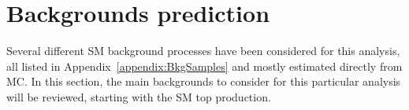 \documentclass[a4paper, 10pt, openright]{report}
\begin{document}
\chapter{Backgrounds prediction} \label{section:CR}

Several different \ac{SM} background processes have been considered for this analysis, all listed in Appendix~\ref{appendix:BkgSamples} and mostly estimated directly from \ac{MC}. In this section, the main backgrounds to consider for this particular analysis will be reviewed, starting with the \ac{SM} top production.
\end{document}

